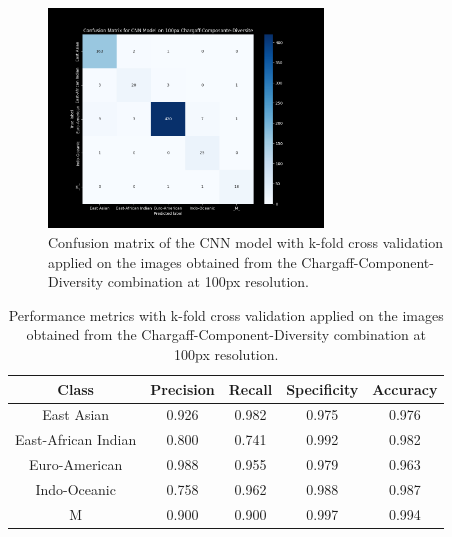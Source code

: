 \begin{figure}[H]
	\centering
	\includegraphics[width=0.65\textwidth]{../imgs/graphs/kfold/cnn_confusion_matrix_100px_mask_5-kfold_std.png}
	\caption{Confusion matrix of the CNN model with k-fold cross validation applied on the images obtained from the Chargaff-Component-Diversity
		combination at 100px resolution.}
	\label{fig:kfold_confusion_matrix}
\end{figure}

\begin{table}[H]
	\centering
	\begin{tabular}{|c|c|c|c|c|}
		\hline
		\textbf{Class}      & \textbf{Precision} & \textbf{Recall} & \textbf{Specificity} & \textbf{Accuracy} \\
		\hline
		East Asian          & 0.926              & 0.982           & 0.975                & 0.976             \\
		East-African Indian & 0.800              & 0.741           & 0.992                & 0.982             \\
		Euro-American       & 0.988              & 0.955           & 0.979                & 0.963             \\
		Indo-Oceanic        & 0.758              & 0.962           & 0.988                & 0.987             \\
		M                   & 0.900              & 0.900           & 0.997                & 0.994             \\
		\hline
	\end{tabular}
	\caption{Performance metrics with k-fold cross validation applied on the images obtained from the Chargaff-Component-Diversity
		combination at 100px resolution.}
	\label{tab:kfold_performance_metrics}
\end{table}


